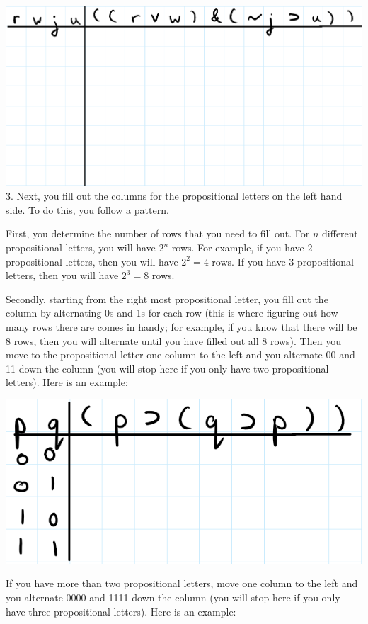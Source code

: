 \documentclass[
]{book}
\begin{document}
\includegraphics{Pictures/Week4Picture2.png}
3. Next, you fill out the columns for the propositional letters on the left hand side. To do this, you follow a pattern.

First, you determine the number of rows that you need to fill out. For \(n\) different propositional letters, you will have \(2^n\) rows. For example, if you have \(2\) propositional letters, then you will have \(2^2 = 4\) rows. If you have \(3\) propositional letters, then you will have \(2^3 = 8\) rows.

Secondly, starting from the right most propositional letter, you fill out the column by alternating 0s and 1s for each row (this is where figuring out how many rows there are comes in handy; for example, if you know that there will be \(8\) rows, then you will alternate until you have filled out all \(8\) rows). Then you move to the propositional letter one column to the left and you alternate 00 and 11 down the column (you will stop here if you only have two propositional letters). Here is an example:

\includegraphics{Pictures/Week4Picture3.png}

If you have more than two propositional letters, move one column to the left and you alternate 0000 and 1111 down the column (you will stop here if you only have three propositional letters). Here is an example:
\end{document}
